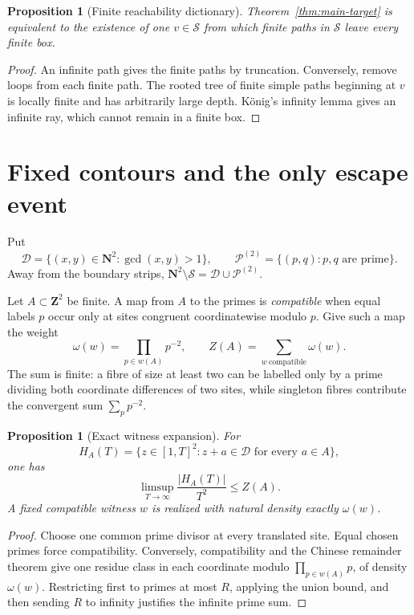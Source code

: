 \documentclass[11pt]{article}
\newtheorem{proposition}[theorem]{Proposition}
\theoremstyle{definition}
\theoremstyle{remark}
\newcommand{\N}{\mathbf N}
\newcommand{\Z}{\mathbf Z}
\newcommand{\cS}{\mathcal S}
\begin{document}
\begin{proposition}[Finite reachability dictionary]
\label{prop:finite-reachability}
Theorem~\ref{thm:main-target} is equivalent to the existence of one
$v\in\cS$ from which finite paths in $\cS$ leave every finite box.
\end{proposition}

\begin{proof}
An infinite path gives the finite paths by truncation.  Conversely, remove
loops from each finite path.  The rooted tree of finite simple paths beginning
at $v$ is locally finite and has arbitrarily large depth.  K\"onig's infinity
lemma gives an infinite ray, which cannot remain in a finite box.
\end{proof}

\section{Fixed contours and the only escape event}

Put
\[
 \mathcal D=\{(x,y)\in\N^2:\gcd(x,y)>1\},\qquad
 \mathcal P^{(2)}=\{(p,q):p,q\text{ are prime}\}.
\]
Away from the boundary strips, $\N^2\setminus\cS=\mathcal D\cup
\mathcal P^{(2)}$.

Let $A\subset\Z^2$ be finite.  A map from $A$ to the primes is
\emph{compatible} when equal labels $p$ occur only at sites congruent
coordinatewise modulo $p$.  Give such a map the weight
\[
 \omega(w)=\prod_{p\in w(A)}p^{-2},\qquad
 Z(A)=\sum_{w\ \mathrm{compatible}}\omega(w).
\]
The sum is finite: a fibre of size at least two can be labelled only by a
prime dividing both coordinate differences of two sites, while singleton
fibres contribute the convergent sum $\sum_p p^{-2}$.

\begin{proposition}[Exact witness expansion]
\label{prop:fixed-witness-expansion}
For
\[
 H_A(T)=\{z\in[1,T]^2:z+a\in\mathcal D\text{ for every }a\in A\},
\]
one has
\[
 \limsup_{T\to\infty}\frac{|H_A(T)|}{T^2}\leq Z(A).
\]
A fixed compatible witness $w$ is realized with natural density exactly
$\omega(w)$.
\end{proposition}

\begin{proof}
Choose one common prime divisor at every translated site.  Equal chosen primes
force compatibility.  Conversely, compatibility and the Chinese remainder
theorem give one residue class in each coordinate modulo
$\prod_{p\in w(A)}p$, of density $\omega(w)$.  Restricting first to primes at
most $R$, applying the union bound, and then sending $R$ to infinity justifies
the infinite prime sum.
\end{proof}
\end{document}
